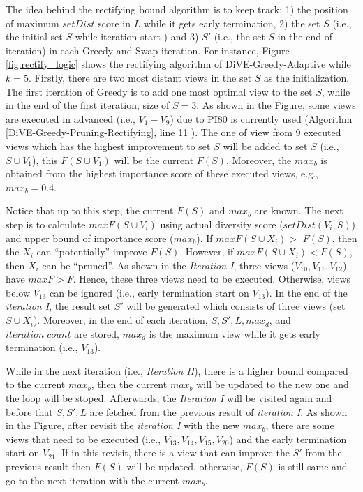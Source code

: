 \documentclass{article}
\begin{document}
The idea behind the rectifying bound algorithm is to keep track: 1) the position of maximum $setDist$ score in $L$ while it gets early termination, 2) the set $S$ (i.e., the initial set $S$ while iteration start ) and 3) $S'$ (i.e., the set $S$ in the end of iteration) in each Greedy and Swap iteration. For instance, Figure \ref{fig:rectify_logic} shows the rectifying algorithm of DiVE-Greedy-Adaptive while $k = 5$. Firstly, there are two most distant views in the set $S$ as the initialization. The first iteration of Greedy is to add one most optimal view to the set $S$, while in the end of the first iteration, size of $S = 3$. As shown in the Figure, some views are executed in advanced (i.e., $V_1 - V_9$) due to PI80 is currently used (Algorithm \ref{DiVE-Greedy-Pruning-Rectifying}, line 11 ). The one of view from 9 executed views which has the highest improvement to set $S$ will be added to set $S$ (i.e., $S \cup V_1$), this $F(S \cup V_1)$ will be the current $F(S)$. Moreover, the $max_b$ is obtained from the highest importance score of these executed views, e.g., $max_b = 0.4$. 

Notice that up to this step, the current $F(S)$ and $max_b$ are known. The next step is to calculate $maxF(S \cup V_i)$ using actual diversity score ($setDist(V_i, S)$) and upper bound of importance score ($max_b$). If $maxF(S \cup X_i) >$  $F(S)$, then the $X_i$ can ``potentially'' improve $F\left(S\right)$. However, if $maxF(S \cup X_i) < F(S)$, then $X_i$ can be ``pruned''. As shown in the \textit{Iteration I}, three views ($V_{10}, V_{11}, V_{12}$) have $maxF > F$. Hence, these three views need to be executed. Otherwise, views below $V_{13}$ can be ignored (i.e., early termination start on $V_{13}$). In the end of the \textit{iteration I}, the result set $S'$ will be generated which consists of three views (set $S \cup X_i$). Moreover, in the end of each iteration, $S, S', L, max_d$, and $iteration\; count$ are stored, $max_d$ is the maximum view while it gets early termination (i.e., $V_{13}$). 

While in the next iteration (i.e., \textit{Iteration II}), there is a higher bound compared to the current $max_b$, then the current $max_b$ will be updated to the new one and the loop will be stoped. Afterwards, the \textit{Iteration I} will be visited again and before that $S, S', L$ are fetched from the previous result of \textit{iteration I}. As shown in the Figure, after revisit the \textit{iteration I} with the new $max_b$, there are some views that need to be executed (i.e., $V_{13}, V_{14}, V_{15}, V_{20}$) and the early termination start on $V_{21}$. If in this revisit, there is a view that can improve the $S'$ from the previous result then $F(S)$ will be updated, otherwise, $F(S)$ is still same and go to the next iteration with the current $max_b$.     
\end{document}
